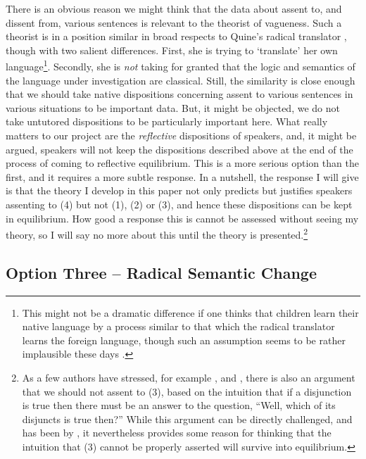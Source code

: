 There is an obvious reason we might think that the data about assent to, and dissent from, various sentences is relevant to the theorist of vagueness. Such a theorist is in a position similar in broad respects to Quine's radical translator \cite[26-35]{Quine1960}, though with two salient differences. First, she is trying to `translate' her own language\footnote{This might not be a dramatic difference if one thinks that children learn their native language by a process similar to that which the radical translator learns the foreign language, though such an assumption seems to be rather implausible these days \citep{Laurence2001}.}. Secondly, she is \textit{not} taking for granted that the logic and semantics of the language under investigation are classical. Still, the similarity is close enough that we should take native dispositions concerning assent to various sentences in various situations to be important data. But, it might be objected, we do not take untutored dispositions to be particularly important here. What really matters to our project are the \textit{reflective} dispositions of speakers, and, it might be argued, speakers will not keep the dispositions described above at the end of the process of coming to reflective equilibrium. This is a more serious option than the first, and it requires a more subtle response. In a nutshell, the response I will give is that the theory I develop in this paper not only predicts but justifies speakers assenting to (4) but not (1), (2) or (3), and hence these dispositions can be kept in equilibrium. How good a response this is cannot be assessed without seeing my theory, so I will say no more about this until the theory is presented.\footnote{As a few authors have stressed, for example \citet{Sanford1976}, \citet{Tye1990} and \citet{Tappenden1993}, there is also an argument that we should not assent to (3), based on the intuition that if a disjunction is true then there must be an answer to the question, ``Well, which of its disjuncts is true then?'' While this argument can be directly challenged, and has been by \citet{Dummett1975}, it nevertheless provides some reason for thinking that the intuition that (3) cannot be properly asserted will survive into equilibrium.}

\subsection*{Option Three -- Radical Semantic Change}

